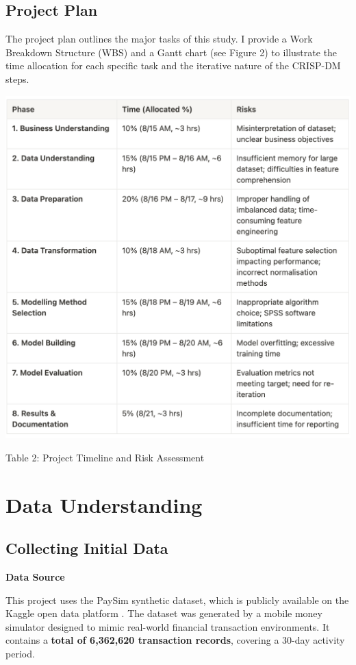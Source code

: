 \documentclass[sigplan,screen]{acmart}
\begin{document}
\subsection{Project Plan}
The project plan outlines the major tasks of this study. I provide a Work Breakdown Structure (WBS) and a Gantt chart (see Figure 2) to illustrate the time allocation for each specific task and the iterative nature of the CRISP-DM steps.

\vspace{0.3cm}

\begin{center}
\includegraphics[width=0.9\columnwidth]{table2.jpg}
\vspace{0.2cm}

Table 2: Project Timeline and Risk Assessment
\end{center}

\vspace{0.3cm}

\section{Data Understanding}
\subsection{Collecting Initial Data}

\textbf{Data Source}

This project uses the PaySim synthetic dataset, which is publicly available on the Kaggle open data platform \cite{paysim2024}. The dataset was generated by a mobile money simulator designed to mimic real-world financial transaction environments. It contains a \textbf{total of 6,362,620 transaction records}, covering a 30-day activity period.
\end{document}
